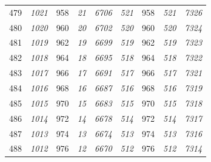 \documentclass[10pt,fleqn]{article}
\begin{document}
\begin{longtable}{c|cccccccc}
479 & {\color{blue} \it 1021 \rm} & {\color{black} 958} & {\color{blue} \it 21 \rm} & {\color{blue} \it 6706 \rm} & {\color{blue} \it 521 \rm} & {\color{black} 958} & {\color{blue} \it 521 \rm} & {\color{blue} \it 7326 \rm} \\
480 & {\color{blue} \it 1020 \rm} & {\color{black} 960} & {\color{blue} \it 20 \rm} & {\color{blue} \it 6702 \rm} & {\color{blue} \it 520 \rm} & {\color{black} 960} & {\color{blue} \it 520 \rm} & {\color{blue} \it 7324 \rm} \\
481 & {\color{blue} \it 1019 \rm} & {\color{black} 962} & {\color{blue} \it 19 \rm} & {\color{blue} \it 6699 \rm} & {\color{blue} \it 519 \rm} & {\color{black} 962} & {\color{blue} \it 519 \rm} & {\color{blue} \it 7323 \rm} \\
482 & {\color{blue} \it 1018 \rm} & {\color{black} 964} & {\color{blue} \it 18 \rm} & {\color{blue} \it 6695 \rm} & {\color{blue} \it 518 \rm} & {\color{black} 964} & {\color{blue} \it 518 \rm} & {\color{blue} \it 7322 \rm} \\
483 & {\color{blue} \it 1017 \rm} & {\color{black} 966} & {\color{blue} \it 17 \rm} & {\color{blue} \it 6691 \rm} & {\color{blue} \it 517 \rm} & {\color{black} 966} & {\color{blue} \it 517 \rm} & {\color{blue} \it 7321 \rm} \\
484 & {\color{blue} \it 1016 \rm} & {\color{black} 968} & {\color{blue} \it 16 \rm} & {\color{blue} \it 6687 \rm} & {\color{blue} \it 516 \rm} & {\color{black} 968} & {\color{blue} \it 516 \rm} & {\color{blue} \it 7319 \rm} \\
485 & {\color{blue} \it 1015 \rm} & {\color{black} 970} & {\color{blue} \it 15 \rm} & {\color{blue} \it 6683 \rm} & {\color{blue} \it 515 \rm} & {\color{black} 970} & {\color{blue} \it 515 \rm} & {\color{blue} \it 7318 \rm} \\
486 & {\color{blue} \it 1014 \rm} & {\color{black} 972} & {\color{blue} \it 14 \rm} & {\color{blue} \it 6678 \rm} & {\color{blue} \it 514 \rm} & {\color{black} 972} & {\color{blue} \it 514 \rm} & {\color{blue} \it 7317 \rm} \\
487 & {\color{blue} \it 1013 \rm} & {\color{black} 974} & {\color{blue} \it 13 \rm} & {\color{blue} \it 6674 \rm} & {\color{blue} \it 513 \rm} & {\color{black} 974} & {\color{blue} \it 513 \rm} & {\color{blue} \it 7316 \rm} \\
488 & {\color{blue} \it 1012 \rm} & {\color{black} 976} & {\color{blue} \it 12 \rm} & {\color{blue} \it 6670 \rm} & {\color{blue} \it 512 \rm} & {\color{black} 976} & {\color{blue} \it 512 \rm} & {\color{blue} \it 7314 \rm} \\

\end{longtable}
\end{document}
